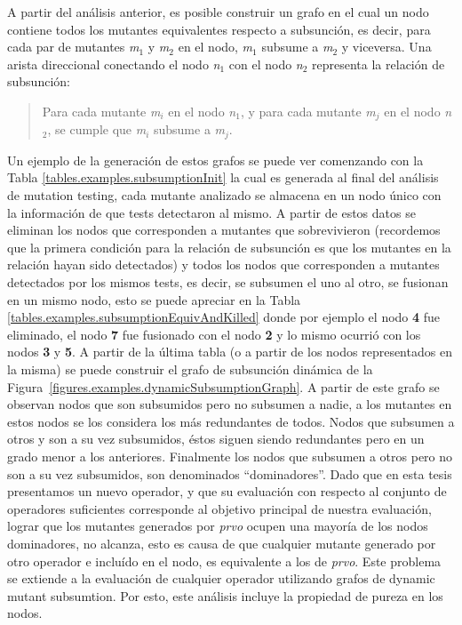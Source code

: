 A partir del an\'alisis anterior, es posible construir un grafo en el cual un nodo contiene todos los mutantes equivalentes respecto a subsunci\'on, es decir, para cada par de mutantes \emph{m$_1$} y \emph{m$_2$} en el nodo, \emph{m$_1$} subsume a \emph{m$_2$} y viceversa. Una arista direccional conectando el nodo \emph{n$_1$} con el nodo \emph{n$_2$} representa la relaci\'on de subsunci\'on:
\begin{quote}
	Para cada mutante \emph{m$_i$} en el nodo \emph{n$_1$}, y para cada mutante \emph{m$_j$} en el nodo \emph{n$_2$}, se cumple que \emph{m$_i$} subsume a \emph{m$_j$}.
\end{quote}
Un ejemplo de la generaci\'on de estos grafos se puede ver comenzando con la Tabla \ref{tables.examples.subsumptionInit} la cual es generada al final del an\'alisis de mutation testing, cada mutante analizado se almacena en un nodo \'unico con la informaci\'on de que tests detectaron al mismo. A partir de estos datos se eliminan los nodos que corresponden a mutantes que sobrevivieron (recordemos que la primera condici\'on para la relaci\'on de subsunci\'on es que los mutantes en la relaci\'on hayan sido detectados) y todos los nodos que corresponden a mutantes detectados por los mismos tests, es decir, se subsumen el uno al otro, se fusionan en un mismo nodo, esto se puede apreciar en la Tabla \ref{tables.examples.subsumptionEquivAndKilled} donde por ejemplo el nodo \textbf{4} fue eliminado, el nodo \textbf{7} fue fusionado con el nodo \textbf{2} y lo mismo ocurri\'o con los nodos \textbf{3} y \textbf{5}. A partir de la \'ultima tabla (o a partir de los nodos representados en la misma) se puede construir el grafo de subsunci\'on din\'amica de la Figura~\ref{figures.examples.dynamicSubsumptionGraph}.
A partir de este grafo se observan nodos que son subsumidos pero no subsumen a nadie, a los mutantes en estos nodos se los considera los m\'as redundantes de todos. Nodos que subsumen a otros y son a su vez subsumidos, \'estos siguen siendo redundantes pero en un grado menor a los anteriores. Finalmente los nodos que subsumen a otros pero no son a su vez subsumidos, son denominados ``dominadores''. Dado que en esta tesis presentamos un nuevo operador, y que su evaluaci\'on con respecto al conjunto de operadores suficientes corresponde al objetivo principal de nuestra evaluaci\'on, lograr que los mutantes generados por \emph{prvo} ocupen una mayor\'ia de los nodos dominadores, no alcanza, esto es causa de que cualquier mutante generado por otro operador e inclu\'ido en el nodo, es equivalente a los de \emph{prvo}. Este problema se extiende a la evaluaci\'on de cualquier operador utilizando grafos de dynamic mutant subsumtion. Por esto, este an\'alisis incluye la propiedad de pureza en los nodos.
